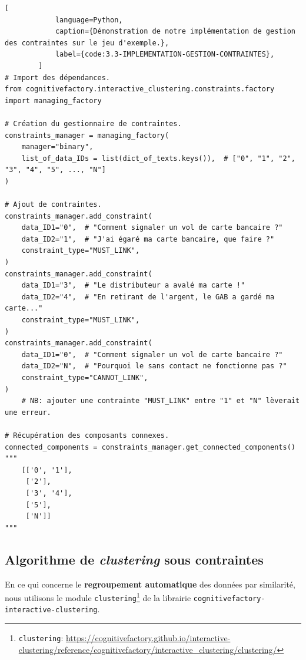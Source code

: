 		\begin{lstlisting}[
			language=Python,
			caption={Démonstration de notre implémentation de gestion des contraintes sur le jeu d'exemple.},
			label={code:3.3-IMPLEMENTATION-GESTION-CONTRAINTES},
		]
# Import des dépendances.
from cognitivefactory.interactive_clustering.constraints.factory import managing_factory

# Création du gestionnaire de contraintes.
constraints_manager = managing_factory(
	manager="binary",
	list_of_data_IDs = list(dict_of_texts.keys()),  # ["0", "1", "2", "3", "4", "5", ..., "N"]
)

# Ajout de contraintes.
constraints_manager.add_constraint(
	data_ID1="0",  # "Comment signaler un vol de carte bancaire ?"
	data_ID2="1",  # "J'ai égaré ma carte bancaire, que faire ?"
	constraint_type="MUST_LINK",
)
constraints_manager.add_constraint(
	data_ID1="3",  # "Le distributeur a avalé ma carte !"
	data_ID2="4",  # "En retirant de l'argent, le GAB a gardé ma carte..."
	constraint_type="MUST_LINK",
)
constraints_manager.add_constraint(
	data_ID1="0",  # "Comment signaler un vol de carte bancaire ?"
	data_ID2="N",  # "Pourquoi le sans contact ne fonctionne pas ?"
	constraint_type="CANNOT_LINK",
)
	# NB: ajouter une contrainte "MUST_LINK" entre "1" et "N" lèverait une erreur.

# Récupération des composants connexes.
connected_components = constraints_manager.get_connected_components()
"""
	[['0', '1'],
	 ['2'],
	 ['3', '4'],
	 ['5'],
	 ['N']]
"""
		\end{lstlisting}
		
		
		\subsection{Algorithme de \textit{clustering} sous contraintes}
		\label{section:3.3.3-ALGORITHMES-CLUSTERING-SOUS-CONTRAINTES}
		
		En ce qui concerne le \textbf{regroupement automatique} des données par similarité, nous utilisons le module \texttt{clustering}\footnote{
			\texttt{clustering}: \url{https://cognitivefactory.github.io/interactive-clustering/reference/cognitivefactory/interactive_clustering/clustering/}
		} de la librairie \texttt{cognitivefactory-interactive-clustering}.
		
